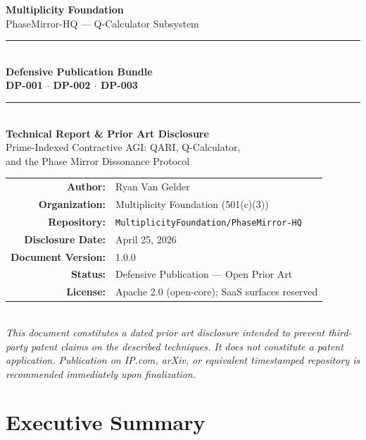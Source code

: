 \documentclass[12pt,letterpaper]{article}
\begin{document}
\begin{titlepage}
  \centering
  \vspace*{1.5cm}
  {\LARGE\bfseries Multiplicity Foundation}\\[0.4cm]
  {\large PhaseMirror-HQ --- Q-Calculator Subsystem}\\[1.2cm]
  \rule{\linewidth}{0.5pt}\\[0.4cm]
  {\Huge\bfseries Defensive Publication Bundle\\[0.3cm]
  \large DP-001 $\cdot$ DP-002 $\cdot$ DP-003}\\[0.4cm]
  \rule{\linewidth}{0.5pt}\\[1cm]
  {\large\bfseries Technical Report \& Prior Art Disclosure}\\[0.3cm]
  {\large Prime-Indexed Contractive AGI: QARI, Q-Calculator,\\
  and the Phase Mirror Dissonance Protocol}\\[2cm]
  \begin{tabular}{rl}
    \textbf{Author:}      & Ryan Van Gelder \\
    \textbf{Organization:}& Multiplicity Foundation (501(c)(3)) \\
    \textbf{Repository:}  & \texttt{MultiplicityFoundation/PhaseMirror-HQ} \\
    \textbf{Disclosure Date:} & April 25, 2026 \\
    \textbf{Document Version:} & 1.0.0 \\
    \textbf{Status:}      & Defensive Publication --- Open Prior Art \\
    \textbf{License:}     & Apache 2.0 (open-core); SaaS surfaces reserved \\
  \end{tabular}\\[2cm]
  {\small\itshape This document constitutes a dated prior art disclosure
  intended to prevent third-party patent claims on the described
  techniques. It does not constitute a patent application. Publication
  on IP.com, arXiv, or equivalent timestamped repository is recommended
  immediately upon finalization.}
\end{titlepage}

\tableofcontents
\newpage

\section{Executive Summary}
\end{document}
